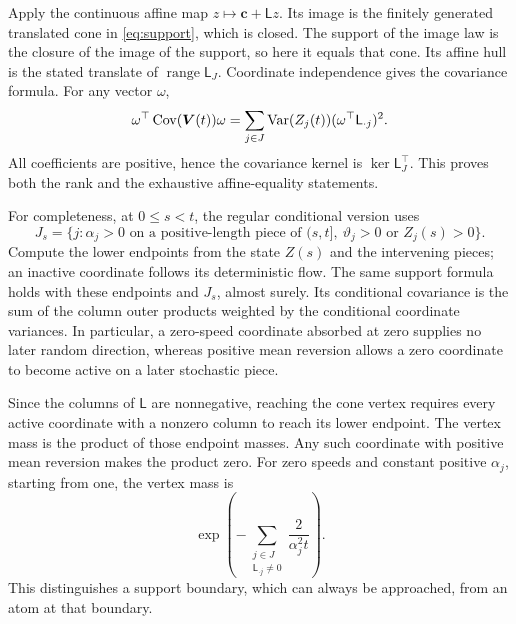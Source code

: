 Apply the continuous affine map $z\mapsto\boldsymbol c+\mathsf Lz$. Its image is the finitely generated translated cone in \eqref{eq:support}, which is closed. The support of the image law is the closure of the image of the support, so here it equals that cone. Its affine hull is the stated translate of $\operatorname{range}\mathsf L_J$. Coordinate independence gives the covariance formula. For any vector $\omega$,
\[
\omega^\top\operatorname{Cov}(\boldsymbol V(t))\omega
 =\sum_{j\in J}\operatorname{Var}(Z_j(t))(\omega^\top\mathsf L_{\cdot j})^2.
\]
All coefficients are positive, hence the covariance kernel is $\ker\mathsf L_J^\top$. This proves both the rank and the exhaustive affine-equality statements.

For completeness, at $0\leq s<t$, the regular conditional version uses
\[
J_s=\{j:\alpha_j>0\text{ on a positive-length piece of }(s,t],
                   \ \vartheta_j>0\text{ or }Z_j(s)>0\}.
\]
Compute the lower endpoints from the state $Z(s)$ and the intervening pieces; an inactive coordinate follows its deterministic flow. The same support formula holds with these endpoints and $J_s$, almost surely. Its conditional covariance is the sum of the column outer products weighted by the conditional coordinate variances. In particular, a zero-speed coordinate absorbed at zero supplies no later random direction, whereas positive mean reversion allows a zero coordinate to become active on a later stochastic piece.

Since the columns of $\mathsf L$ are nonnegative, reaching the cone vertex requires every active coordinate with a nonzero column to reach its lower endpoint. The vertex mass is the product of those endpoint masses. Any such coordinate with positive mean reversion makes the product zero. For zero speeds and constant positive $\alpha_j$, starting from one, the vertex mass is
\[
\exp\left(-\sum_{\substack{j\in J\\\mathsf L_{\cdot j}\ne0}}
                            \frac{2}{\alpha_j^2t}\right).
\]
This distinguishes a support boundary, which can always be approached, from an atom at that boundary.
